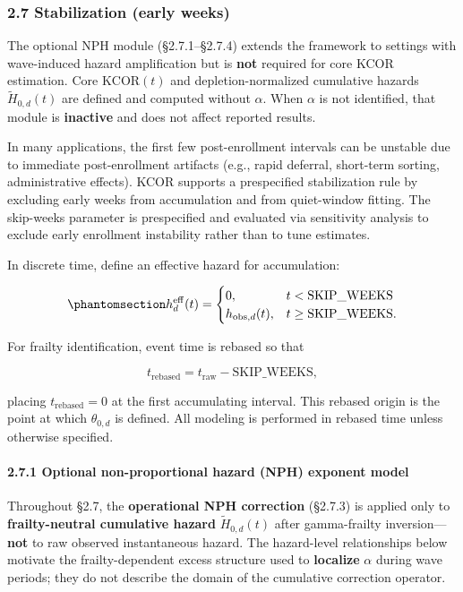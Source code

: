 \documentclass[
]{article}
\begin{document}
\subsubsection{2.7 Stabilization (early weeks)}\label{stabilization-early-weeks}

The optional NPH module (§2.7.1--§2.7.4) extends the framework to settings with wave-induced hazard amplification but is \textbf{not} required for core KCOR estimation. Core \(\mathrm{KCOR}(t)\) and depletion-normalized cumulative hazards \(\tilde H_{0,d}(t)\) are defined and computed without \(\alpha\). When \(\alpha\) is not identified, that module is \textbf{inactive} and does not affect reported results.

In many applications, the first few post-enrollment intervals can be unstable due to immediate post-enrollment artifacts (e.g., rapid deferral, short-term sorting, administrative effects). KCOR supports a prespecified stabilization rule by excluding early weeks from accumulation and from quiet-window fitting. The skip-weeks parameter is prespecified and evaluated via sensitivity analysis to exclude early enrollment instability rather than to tune estimates.

In discrete time, define an effective hazard for accumulation:

\begin{equation}\protect\phantomsection\label{eq:effective-hazard-skip}{h_d^{\mathrm{eff}}(t)=
\begin{cases}
0, & t < \mathrm{SKIP\_WEEKS} \\
h_{\mathrm{obs},d}(t), & t \ge \mathrm{SKIP\_WEEKS}.
\end{cases}}\end{equation}

For frailty identification, event time is rebased so that

\[t_{\mathrm{rebased}} = t_{\mathrm{raw}} - \mathrm{SKIP\_WEEKS},\]

placing \(t_{\mathrm{rebased}}=0\) at the first accumulating interval. This rebased origin is the point at which \(\theta_{0,d}\) is defined. All modeling is performed in rebased time unless otherwise specified.

\paragraph{2.7.1 Optional non-proportional hazard (NPH) exponent model}\label{optional-non-proportional-hazard-nph-exponent-model}

Throughout §2.7, the \textbf{operational NPH correction} (§2.7.3) is applied only to \textbf{frailty-neutral cumulative hazard} \(\tilde H_{0,d}(t)\) after gamma-frailty inversion---\textbf{not} to raw observed instantaneous hazard. The hazard-level relationships below motivate the frailty-dependent excess structure used to \textbf{localize} \(\alpha\) during wave periods; they do not describe the domain of the cumulative correction operator.
\end{document}
